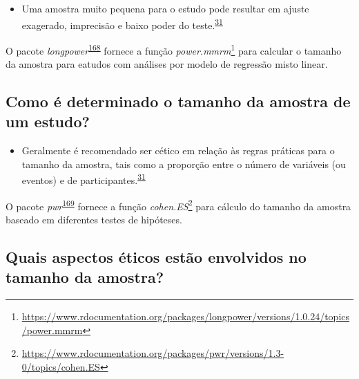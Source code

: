 \documentclass[
  a4paper,
]{book}
\providecommand{\tightlist}{%
  \setlength{\itemsep}{0pt}\setlength{\parskip}{0pt}}
\renewcommand{\href}[2]{#2\footnote{\url{#1}}}
\newenvironment{infobox}[1]
  {
  \begin{itemize}
  \renewcommand{\labelitemi}{
    \raisebox{-.7\height}[0pt][0pt]{
      {\setkeys{Gin}{width=3em,keepaspectratio}
        \texttt{[image: \#1]}}
    }
  }
  \setlength{\fboxsep}{1em}
  \begin{blackbox}
  \item
  }
  {
  \end{blackbox}
  \end{itemize}
  }
\begin{document}
\begin{itemize}
\tightlist
\item
  Uma amostra muito pequena para o estudo pode resultar em ajuste exagerado, imprecisão e baixo poder do teste.\textsuperscript{\protect\hyperlink{ref-van2022a}{31}}
\end{itemize}

\begin{infobox}{images/Rlogo}
O pacote \emph{longpower}\textsuperscript{\protect\hyperlink{ref-longpower}{168}} fornece a função \href{https://www.rdocumentation.org/packages/longpower/versions/1.0.24/topics/power.mmrm}{\emph{power.mmrm}} para calcular o tamanho da amostra para eatudos com análises por modelo de regressão misto linear.

\end{infobox}

\hypertarget{como-uxe9-determinado-o-tamanho-da-amostra-de-um-estudo}{%
\subsection{Como é determinado o tamanho da amostra de um estudo?}\label{como-uxe9-determinado-o-tamanho-da-amostra-de-um-estudo}}

\begin{itemize}
\tightlist
\item
  Geralmente é recomendado ser cético em relação às regras práticas para o tamanho da amostra, tais como a proporção entre o número de variáveis (ou eventos) e de participantes.\textsuperscript{\protect\hyperlink{ref-van2022a}{31}}
\end{itemize}

\begin{infobox}{images/Rlogo}
O pacote \emph{pwr}\textsuperscript{\protect\hyperlink{ref-pwr}{169}} fornece a função \href{https://www.rdocumentation.org/packages/pwr/versions/1.3-0/topics/cohen.ES}{\emph{cohen.ES}} para cálculo do tamanho da amostra baseado em diferentes testes de hipóteses.

\end{infobox}

\hypertarget{quais-aspectos-uxe9ticos-estuxe3o-envolvidos-no-tamanho-da-amostra}{%
\subsection{Quais aspectos éticos estão envolvidos no tamanho da amostra?}\label{quais-aspectos-uxe9ticos-estuxe3o-envolvidos-no-tamanho-da-amostra}}
\end{document}
